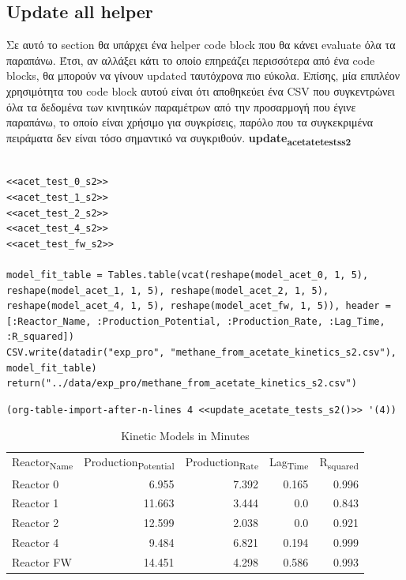 \documentclass[11pt]{article}
\begin{document}
\subsection{Update all helper}
\label{sec:orgafcaf37}
Σε αυτό το section θα υπάρχει ένα helper code block που θα κάνει evaluate όλα τα παραπάνω. Έτσι, αν αλλάξει κάτι το οποίο επηρεάζει περισσότερα από ένα code blocks, θα μπορούν να γίνουν updated ταυτόχρονα πιο εύκολα. Επίσης, μία επιπλέον χρησιμότητα του code block αυτού είναι ότι αποθηκεύει ένα CSV που συγκεντρώνει όλα τα δεδομένα των κινητικών παραμέτρων από την προσαρμογή που έγινε παραπάνω, το οποίο είναι χρήσιμο για συγκρίσεις, παρόλο που τα συγκεκριμένα πειράματα δεν είναι τόσο σημαντικό να συγκριθούν.
\textbf{update\textsubscript{acetate}\textsubscript{tests}\textsubscript{s2}}
\begin{verbatim}

<<acet_test_0_s2>>
<<acet_test_1_s2>>
<<acet_test_2_s2>>
<<acet_test_4_s2>>
<<acet_test_fw_s2>>

model_fit_table = Tables.table(vcat(reshape(model_acet_0, 1, 5), reshape(model_acet_1, 1, 5), reshape(model_acet_2, 1, 5), reshape(model_acet_4, 1, 5), reshape(model_acet_fw, 1, 5)), header = [:Reactor_Name, :Production_Potential, :Production_Rate, :Lag_Time, :R_squared])
CSV.write(datadir("exp_pro", "methane_from_acetate_kinetics_s2.csv"), model_fit_table)
return("../data/exp_pro/methane_from_acetate_kinetics_s2.csv")
\end{verbatim}

\begin{verbatim}
(org-table-import-after-n-lines 4 <<update_acetate_tests_s2()>> '(4))
\end{verbatim}

\begin{table}[htbp]
\caption{Kinetic Models in Minutes}
\centering
\begin{tabular}{lrrrr}
Reactor\textsubscript{Name} & Production\textsubscript{Potential} & Production\textsubscript{Rate} & Lag\textsubscript{Time} & R\textsubscript{squared}\\[0pt]
Reactor 0 & 6.955 & 7.392 & 0.165 & 0.996\\[0pt]
Reactor 1 & 11.663 & 3.444 & 0.0 & 0.843\\[0pt]
Reactor 2 & 12.599 & 2.038 & 0.0 & 0.921\\[0pt]
Reactor 4 & 9.484 & 6.821 & 0.194 & 0.999\\[0pt]
Reactor FW & 14.451 & 4.298 & 0.586 & 0.993\\[0pt]
\end{tabular}
\end{table}
\end{document}
